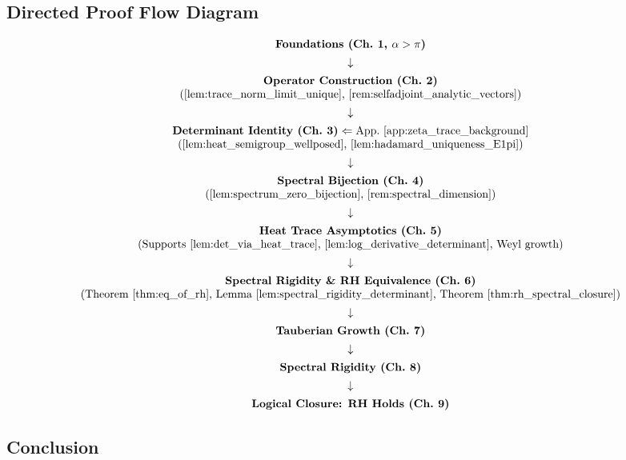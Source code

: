 \subsection*{Directed Proof Flow Diagram}
\label{fig:dag_appendix_b}

\[
\begin{array}{c}
\textbf{Foundations (Ch.~1, $\alpha > \pi$)} \\[1ex]
\downarrow \\[1ex]
\textbf{Operator Construction (Ch.~2)} \\
\text{(\cref{lem:trace_norm_limit_unique}, \cref{rem:selfadjoint_analytic_vectors})} \\[1ex]
\downarrow \\[1ex]
\textbf{Determinant Identity (Ch.~3)} \Leftarrow \text{App.~\ref{app:zeta_trace_background}} \\
\text{(\cref{lem:heat_semigroup_wellposed}, \cref{lem:hadamard_uniqueness_E1pi})} \\[1ex]
\downarrow \\[1ex]
\textbf{Spectral Bijection (Ch.~4)} \\
\text{(\cref{lem:spectrum_zero_bijection}, \cref{rem:spectral_dimension})} \\[1ex]
\downarrow \\[1ex]
\textbf{Heat Trace Asymptotics (Ch.~5)} \\
\text{(Supports \cref{lem:det_via_heat_trace}, \cref{lem:log_derivative_determinant}, Weyl growth)} \\[1ex]
\downarrow \\[1ex]
\textbf{Spectral Rigidity \& RH Equivalence (Ch.~6)} \\
\text{(\thmref{thm:eq_of_rh}, \lemref{lem:spectral_rigidity_determinant}, \thmref{thm:rh_spectral_closure})} \\[1ex]
\downarrow \\[1ex]
\textbf{Tauberian Growth (Ch.~7)} \\[1ex]
\downarrow \\[1ex]
\textbf{Spectral Rigidity (Ch.~8)} \\[1ex]
\downarrow \\[1ex]
\textbf{Logical Closure: RH Holds (Ch.~9)}
\end{array}
\]

\subsection*{Conclusion}

